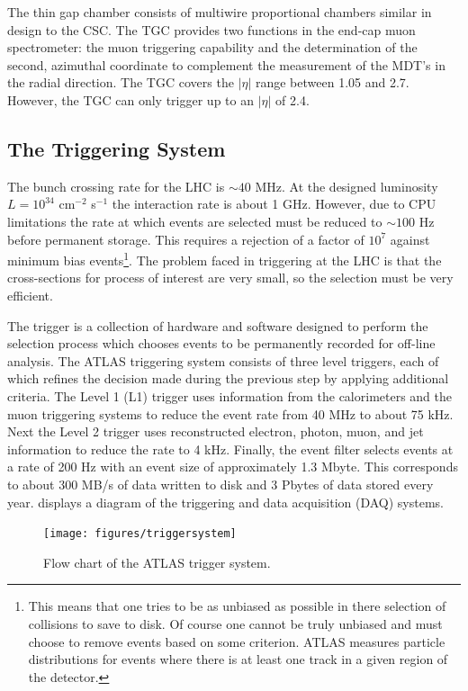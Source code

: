 The thin gap chamber consists of multiwire proportional chambers similar
in design to the CSC. The TGC provides two functions in the end-cap muon spectrometer:
the muon triggering capability and the determination of the second, azimuthal 
coordinate to complement the measurement of the MDT's in the radial direction.
The TGC covers the $|\eta|$ range between 1.05 and 2.7. However, the TGC
can only trigger up to an $|\eta|$ of 2.4.

\subsection{The Triggering System}
The bunch crossing rate for the LHC is $\sim 40$ MHz. At the designed luminosity
$L = 10^{34}$ cm$^{-2}$ s$^{-1}$ the interaction rate is about 1 GHz. However,
due to CPU limitations the rate at which events are selected must be reduced
to $\sim 100$ Hz before permanent storage. This requires a rejection of
a factor of $10^7$ against minimum bias events\footnote{This means that
one tries to be as unbiased as possible in there selection of collisions 
to save to disk. Of course one cannot be truly unbiased and must choose
to remove events based on some criterion. ATLAS measures particle distributions
for events where there is at least one track in a given region of the detector.}.
The problem faced in triggering at the LHC is that the cross-sections for
process of interest are very small, so the selection must be very 
efficient.

The trigger is a collection of hardware and software designed to perform
the selection process which chooses events to be permanently recorded for
off-line analysis. The ATLAS triggering system consists of three level triggers,
each of which refines the decision made during the previous step by applying
additional criteria. The Level 1 (L1) trigger uses information from the
calorimeters and the muon triggering systems to reduce the event rate from
40 MHz to about 75 kHz. Next the Level 2 trigger uses reconstructed electron,
photon, muon, and jet information to reduce the rate to 4 kHz. Finally,
the event filter selects events at a rate of 200 Hz with an event size
of approximately 1.3 Mbyte. This corresponds to about 300 MB/s of data written 
to disk and 3 Pbytes of data stored every year.  displays 
a diagram of the triggering and data acquisition (DAQ) systems.

\begin{figure}[!hbpt]
  \centering
  \texttt{[image: figures/triggersystem]}
  \caption{Flow chart of the ATLAS trigger system.}
  \label{fig:trigger}
\end{figure}
